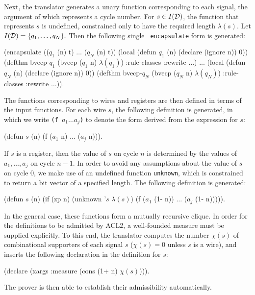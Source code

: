 \documentclass{article}
\begin{document}
Next, the translator generates a unary function corresponding to each
signal, the argument of which represents a cycle number.  For $s \in
I({\cal D})$, the function that represents $s$ is undefined,
constrained only to have the required length $\lambda(s)$.  Let
$I({\cal D}) = \{q_1,\ldots,q_N\}.$  Then the following single {\tt
encapsulate} form is generated:\medskip

\begin{acl2}
(encapsulate (($q_1$ (n) t) $\ldots$ ($q_N$ (n) t))
  (local (defun $q_1$ (n) (declare (ignore n)) 0))
  (defthm bvecp-$q_1$
     (bvecp ($q_1$ n) $\lambda(q_1)$)
     :rule-classes :rewrite $\ldots$)
  ...
  (local (defun $q_N$ (n) (declare (ignore n)) 0))
  (defthm bvecp-$q_N$
     (bvecp ($q_N$ n) $\lambda(q_N)$)
     :rule-classes :rewrite $\ldots$)).
\end{acl2}\noindent
The functions corresponding to wires and registers are then defined in terms
of the input functions.  For each wire $s$, the following definition is
generated, in which we write {\tt (f $a_1 \ldots a_j$)} to denote the form
derived from the expression for $s$:\medskip

\begin{acl2}
(defun $s$ (n) 
  (f ($a_1$ n) $\ldots$ ($a_j$ n))).
\end{acl2}\noindent
If $s$ is a register, then the value of $s$ on cycle $n$ is determined
by the values of $a_1,\ldots,a_j$ on cycle $n-1$.  In order to avoid
any assumptions about the value of $s$ on cycle $0$, we make use of an
undefined function {\tt unknown}, which is constrained to return a bit
vector of a specified length.  The following definition is
generated:\medskip

\begin{acl2}
(defun $s$ (n)
  (if (zp n)
      (unknown '$s$ $\lambda(s)$)
    (f ($a_1$ (1- n)) $\ldots$ ($a_j$ (1- n))))).
\end{acl2}
\indent In the general case, these functions form a mutually recursive clique.
In order for the definitions to be admitted by ACL2, a well-founded measure
must be supplied explicitly.  To this end, the translator computes the number
$\chi(s)$ of combinational supporters of each signal $s$ ($\chi(s) = 0$ unless
$s$ is a wire), and inserts the following declaration in the definition for
$s$:\medskip

\begin{acl2}
(declare (xargs :measure (cons (1+ n) $\chi(s)$))).
\end{acl2}\noindent
The prover is then able to establish their admissibility
automatically.
\end{document}
